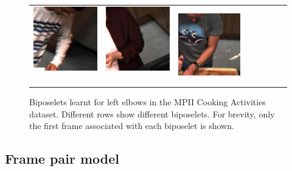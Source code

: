 \documentclass[runningheads]{llncs}
\begin{document}
\begin{figure}[t]
\begin{center}
\begin{tabular}{@{}c@{}c@{}c@{}c@{}c@{}c@{}c@{}c@{}}
\includegraphics[height=0.10\linewidth]{figures/biposelets/poselet-297/sample-5-f0.jpg}\,&
\includegraphics[height=0.10\linewidth]{figures/biposelets/poselet-297/sample-6-f0.jpg}\,&
\includegraphics[height=0.10\linewidth]{figures/biposelets/poselet-297/sample-7-f0.jpg}\\
\end{tabular}
\end{center}
\vspace{-7mm}
\caption{Biposelets learnt for left elbows in the MPII Cooking Activities
dataset. Different rows show different biposelets. For brevity,
only the first frame associated with each biposelet is shown.}
\label{fig:biposelets}
\end{figure}


\subsection{Frame pair model}
\end{document}
